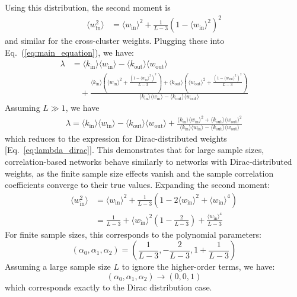 \documentclass[a4paper,pre,superscriptaddress,floatfix,nofootinbib,twocolumn]{revtex4-1}
\begin{document}
Using this distribution, the
second moment is
\begin{align}
    \langle w_\text{in}^2 \rangle &= \langle w_\text{in} \rangle^2 +  \frac{1}{L-3} \left(1 - \langle w_\text{in} \rangle^2\right)^2
\end{align}
and similar for the cross-cluster weights.
Plugging these into Eq.~(\ref{eq:main_equation}), we have:
\begin{align}
    \lambda &=\langle k_{\text{in}} \rangle \langle w_\text{in} \rangle - \langle k_{\text{out}} \rangle \langle w_\text{out} \rangle \nonumber\\
    &\quad +  \frac{\langle k_{\text{in}} \rangle \left(\langle w_\text{in} \rangle^{2} + \frac{\left(1 - \langle w_\text{in} \rangle^{2}\right)^{2}}{L - 3}\right) + \langle k_{\text{out}} \rangle \left(\langle w_\text{out} \rangle^{2} + \frac{\left(1 - \langle w_\text{out} \rangle^{2}\right)^{2}}{L - 3}\right)}{\langle k_{\text{in}} \rangle \langle w_\text{in} \rangle - \langle k_{\text{out}} \rangle \langle w_\text{out} \rangle}
\end{align}
Assuming $L \gg 1$, we have
\begin{align}
    \lambda =\langle k_{\text{in}} \rangle \langle w_\text{in} \rangle - \langle k_{\text{out}} \rangle \langle w_\text{out} \rangle +  \frac{\langle k_{\text{in}} \rangle \langle w_\text{in} \rangle^{2} + \langle k_{\text{out}} \rangle \langle w_\text{out} \rangle^{2}}{\langle k_{\text{in}} \rangle \langle w_\text{in} \rangle - \langle k_{\text{out}} \rangle \langle w_\text{out} \rangle}
\end{align}
which reduces to the expression for Dirac-distributed weights [Eq.~\eqref{eq:lambda_dirac}]. This demonstrates that for large sample sizes, correlation-based networks behave similarly to networks with Dirac-distributed weights, as the finite sample size effects vanish and the sample correlation coefficients converge to their true values.
Expanding the second moment:
\begin{align}
    \langle w_\text{in}^2 \rangle &= \langle w_\text{in} \rangle^2 +  \frac{1}{L-3} \left(1 - 2\langle w_\text{in} \rangle^2 + \langle w_\text{in} \rangle^4\right) \\
    &= \frac{1}{L-3} + \langle w_\text{in} \rangle^2 \left(1 - \frac{2}{L-3}\right) + \frac{\langle w_\text{in} \rangle^4}{L-3}
\end{align}
For finite sample sizes, this corresponds to the polynomial parameters:
\begin{equation}
    (\alpha_0, \alpha_1, \alpha_2) = \left(\frac{1}{L-3}, -\frac{2}{L-3}, 1 + \frac{1}{L-3}\right)
    \label{eq:correlation_coefficients}
\end{equation}
Assuming a large sample size $L$ to ignore the higher-order terms, we have:
\begin{equation}
    (\alpha_0, \alpha_1, \alpha_2) \rightarrow (0, 0, 1)
\end{equation}
which corresponds exactly to the Dirac distribution case.
\end{document}
